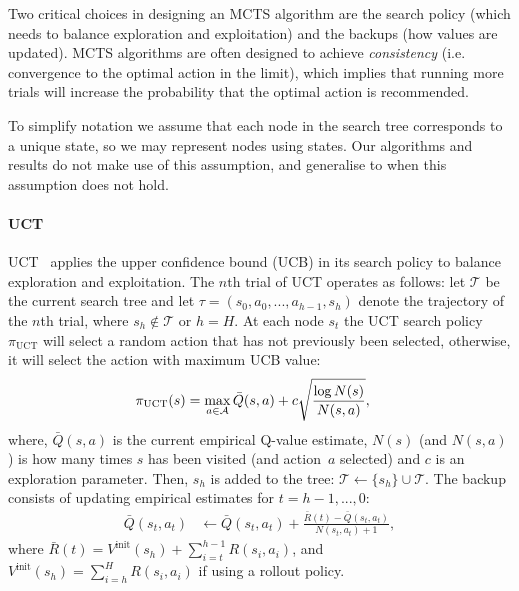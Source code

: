 \documentclass{article}
\newcommand{\cl}[1]{\mathcal{#1}}
\theoremstyle{plain}
\begin{document}
        Two critical choices in designing an MCTS algorithm are the search policy (which needs to balance exploration and exploitation) and the backups (how values are updated). MCTS algorithms are often designed to achieve \textit{consistency} (i.e. convergence to the optimal action in the limit), which implies that running more trials will increase the probability that the optimal action is recommended.
        
        To simplify notation we assume that each node in the search tree corresponds to a unique state, so we may represent nodes using states. Our algorithms and results do not make use of this assumption, and generalise to when this assumption does not hold.
    
        \paragraph{UCT} 
            UCT~\cite{kocsis2006uct} applies the upper confidence bound (UCB) in its search policy to balance exploration and exploitation. The $n$th trial of UCT operates as follows: let $\cl{T}$ be the current search tree and let $\tau=(s_0,a_0,...,a_{h-1},s_{h})$ denote the trajectory of the $n$th trial, where $s_h\not\in\cl{T}$ or $h=H$. At each node $s_t$ the UCT search policy $\pi_{\text{UCT}}$ will select a random action that has not previously been selected, otherwise, it will select the action with maximum UCB value:
            \begin{align}
                \pi_{\textnormal{UCT}}(s) &= \max_{a\in\cl{A}} \bar{Q}(s, a)+c \sqrt{\frac{\log N(s)}{N(s, a)}}, \label{eq:uct_distr}
            \end{align}
            \noindent where, $\bar{Q}(s,a)$ is the current empirical Q-value estimate, $N(s)$ (and $N(s,a)$) is how many times $s$ has been visited (and action~$a$ selected) and $c$ is an exploration parameter. Then, $s_h$ is added to the tree: $\cl{T}\leftarrow \{s_h\}\cup\cl{T}$. The backup consists of updating empirical estimates for $t=h-1,...,0$:
            \begin{align}
                \bar{Q}(s_t, a_t) &\leftarrow \bar{Q}(s_t, a_t) + \frac{\bar{R}(t) - \bar{Q}(s_t, a_t)}{N(s_t, a_t) + 1}, \label{eq:uct_qbar}
            \end{align}
            \noindent where $\bar{R}(t) = V^{\text{init}}(s_h) + \sum_{i=t}^{h-1} R(s_i,a_i)$, and $V^{\text{init}}(s_h)=\sum_{i=h}^{H} R(s_i,a_i)$ if using a rollout policy.
    
\end{document}
